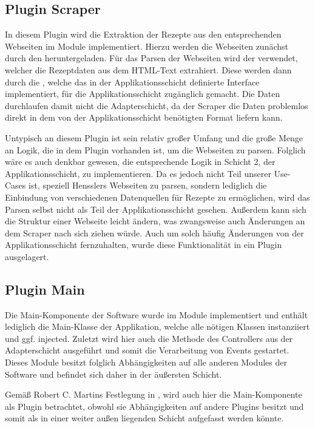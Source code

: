 \subsection{Plugin Scraper}
In diesem Plugin wird die Extraktion der Rezepte aus den entsprechenden Webseiten im Module  implementiert. Hierzu werden die Webseiten zunächst durch den  heruntergeladen. Für das Parsen der Webseiten wird der  verwendet, welcher die Rezeptdaten aus dem HTML-Text extrahiert. Diese werden dann durch die , welche das in der Applikationsschicht definierte Interface  implementiert, für die Applikationsschicht zugänglich gemacht. Die Daten durchlaufen damit nicht die Adapterschicht, da der Scraper die Daten problemlos direkt in dem von der Applikationsschicht benötigten Format liefern kann.

Untypisch an diesem Plugin ist sein relativ großer Umfang und die große Menge an Logik, die in dem Plugin vorhanden ist, um die Webseiten zu parsen. Folglich wäre es auch denkbar gewesen, die entsprechende Logik in Schicht 2, der Applikationsschicht, zu implementieren. Da es jedoch nicht Teil unserer Use-Cases ist, speziell Hensslers Webseiten zu parsen, sondern lediglich die Einbindung von verschiedenen Datenquellen für Rezepte zu ermöglichen, wird das Parsen selbst nicht als Teil der Applikationsschicht gesehen. Außerdem kann sich die Struktur einer Webseite leicht ändern, was zwangsweise auch Änderungen an dem Scraper nach sich ziehen würde. Auch um solch häufig Änderungen von der Applikationsschicht fernzuhalten, wurde diese Funktionalität in ein Plugin ausgelagert. 

\subsection{Plugin Main}
Die Main-Komponente der Software wurde im Module  implementiert und enthält lediglich die Main-Klasse der Applikation, welche alle nötigen Klassen instanziiert und ggf. injected. Zuletzt wird hier auch die Methode  des Controllers aus der Adapterschicht ausgeführt und somit die Verarbeitung von Events gestartet. Dieses Module besitzt folglich Abhängigkeiten auf alle anderen Modules der Software und befindet sich daher in der äußersten Schicht.

Gemäß Robert C. Martins Festlegung in \cite{Martin.2018}, wird auch hier die Main-Komponente als Plugin betrachtet, obwohl sie Abhängigkeiten auf andere Plugins besitzt und somit als in einer weiter außen liegenden Schicht aufgefasst werden könnte.
